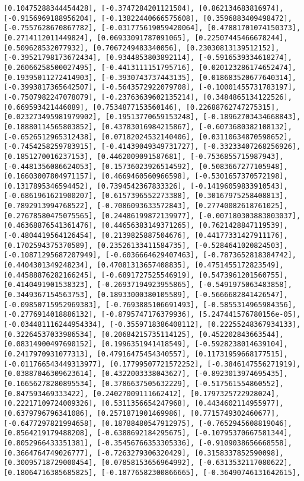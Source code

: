 \documentclass[11pt]{article}
\begin{document}
\begin{Verbatim}[commandchars=\\\{\}]
[0.10475288344454428], [-0.3747284201121504], [0.862134683816974], [-0.9156969188956204], [-0.13822440666575608], [0.3596883409498472], [-0.7557628670867782], [-0.031775619059420064], [0.47881701074150373], [0.2714112011449824], [0.06933091787091065], [0.22507445466678244], [0.509628532077932], [0.7067249483340056], [0.23030813139512152], [-0.39521798173672434], [0.9344853803892114], [-0.5916539334618274], [0.26066258500027495], [-0.4413111151795716], [0.020123286174652474], [0.19395011272414903], [-0.3930743737443135], [0.018683520677640314], [-0.3993817365642507], [-0.5643572922079708], [-0.10001455731783197], [-0.7507982247078079], [-0.23763639602135214], [0.3484865134122526], [0.669593421446089], [0.7534877153560146], [0.22688762747275315], [0.023273495981979902], [0.19513770659153248], [-0.18962703434668843], [0.18880114565803852], [0.43783016984215867], [-0.6073680382108132], [-0.6526512965312438], [0.07182024532140406], [0.03110634870598652], [-0.7454258259783915], [-0.41439049349731727], [-0.33233407268256926], [0.1851270016237153], [0.4462009091587681], [-0.7536855715987943], [-0.4481356086624053], [0.15736023926514592], [0.5083667277105948], [0.16603007804971157], [0.4669460560966598], [-0.5301657370572198], [0.1317895346594452], [0.7394542367833326], [-0.14196059833910543], [-0.6861961621900207], [0.6157396552273388], [0.30167975258408813], [0.7892913994768522], [-0.7086093633572843], [0.27740082618761025], [0.27678580475075565], [0.24486199872139977], [-0.007180303883803037], [0.46368876541361476], [0.44656383149371265], [0.7621428847119539], [-0.4804419564126454], [0.2139825887504676], [0.44177331427911176], [0.1702594375370589], [0.23526133411584735], [-0.5284641020824503], [-0.10871295687207949], [-0.6036664629407463], [-0.7873652818384742], [0.4404301349248234], [0.47081313657408835], [0.4751455172823549], [0.44588876282166245], [-0.6891727525546919], [0.5473961201560755], [0.4140491901538323], [-0.26937194923955865], [-0.5491975063483858], [0.3449367154563753], [0.18933000380105589], [-0.5666682841426547], [-0.09850715952969383], [-0.7693885106691493], [-0.5855314965984356], [-0.2776914018886132], [-0.8795747176379936], [5.247441576780156e-05], [-0.034481116244954334], [-0.3559718386408112], [0.22255248367934133], [0.32264537033986534], [0.20684215735114125], [0.452202843663544], [0.08314900497690152], [0.1996351941418549], [-0.5928238014639104], [0.2417970931077313], [0.47916475454340557], [0.11731959668177515], [-0.011766543449313977], [0.17799507721572252], [-0.3846147556271919], [0.03887046309623614], [0.4322003338043627], [-0.8923013974695435], [0.16656278280895534], [0.3786637505632229], [-0.517561554860552], [0.847593469333422], [0.24027009111662412], [0.1797325722928024], [0.22217109724009326], [0.5311356654247968], [0.4434602114955977], [0.6379796796341086], [0.2571871901469986], [0.7715749302460677], [-0.6477297821994658], [0.18788480547912975], [-0.7652945608819046], [0.8564219179488208], [-0.6388692184295675], [-0.10795370667581344], [0.8052966433351381], [-0.35456766353305336], [-0.9109038656668558], [0.3664764749026777], [-0.7263279306320429], [0.3158337852590098], [0.30095718729000454], [0.07858153656964992], [-0.6313532117080622], [0.18064716385685825], [-0.18776582300866665], [-0.36490746131642615], 
\end{Verbatim}
\end{document}
